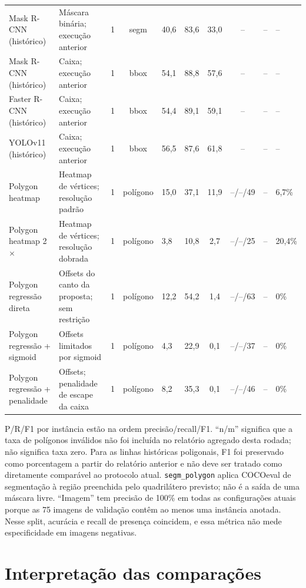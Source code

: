 \documentclass[10pt]{article}
\begin{document}
\begin{table}
{\begin{tabular}{@{}p{2.7cm}p{3.0cm}cclccccl@{}}
\midrule
Mask R-CNN (histórico) & Máscara binária; execução anterior & 1 & segm & 40,6 & 83,6 & 33,0 & -- & -- & -- \\
Mask R-CNN (histórico) & Caixa; execução anterior & 1 & bbox & 54,1 & 88,8 & 57,6 & -- & -- & -- \\
Faster R-CNN (histórico) & Caixa; execução anterior & 1 & bbox & 54,4 & 89,1 & 59,1 & -- & -- & -- \\
YOLOv11 (histórico) & Caixa; execução anterior & 1 & bbox & 56,5 & 87,6 & 61,8 & -- & -- & -- \\
Polygon heatmap & Heatmap de vértices; resolução padrão & 1 & polígono & 15,0 & 37,1 & 11,9 & --/--/49 & -- & 6,7\% \\
Polygon heatmap 2$\times$ & Heatmap de vértices; resolução dobrada & 1 & polígono & 3,8 & 10,8 & 2,7 & --/--/25 & -- & 20,4\% \\
Polygon regressão direta & Offsets do canto da proposta; sem restrição & 1 & polígono & 12,2 & 54,2 & 1,4 & --/--/63 & -- & 0\% \\
Polygon regressão + sigmoid & Offsets limitados por sigmoid & 1 & polígono & 4,3 & 22,9 & 0,1 & --/--/37 & -- & 0\% \\
Polygon regressão + penalidade & Offsets; penalidade de escape da caixa & 1 & polígono & 8,2 & 35,3 & 0,1 & --/--/46 & -- & 0\% \\
\bottomrule
\end{tabular}
}

\vspace{3pt}
\parbox{0.96\textheight}{\scriptsize
P/R/F1 por instância estão na ordem precisão/recall/F1. “n/m” significa que a
taxa de polígonos inválidos não foi incluída no relatório agregado desta rodada;
não significa taxa zero. Para as linhas históricas poligonais, F1 foi preservado
como porcentagem a partir do relatório anterior e não deve ser tratado como
diretamente comparável ao protocolo atual. \texttt{segm\_polygon} aplica
COCOeval de segmentação à região preenchida pelo quadrilátero previsto; não é a
saída de uma máscara livre. “Imagem” tem precisão de 100\% em todas as
configurações atuais porque as 75 imagens de validação contêm ao menos uma
instância anotada. Nesse split, acurácia e recall de presença coincidem, e essa
métrica não mede especificidade em imagens negativas.}
\end{table}

\section{Interpretação das comparações}
\end{document}
